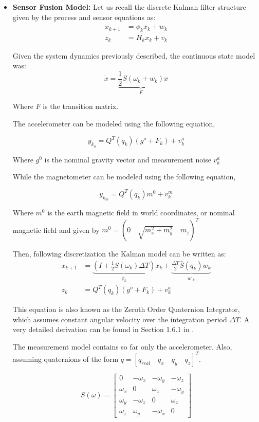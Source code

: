 \documentclass[a4paper,10pt]{article}
\begin{document}
\begin{itemize}
\item \textbf{Sensor Fusion Model: } Let us recall the discrete Kalman filter structure given by the process and sensor equations as:
\begin{align}
 x_{k+1} &= \phi_k x_k + w_k\\
 z_k     &= H_k x_k + v_k
\end{align}

Given the system dynamics previously described, the continuous state model was:
\begin{equation}
  \dot{x} = \underbrace{\frac{1}{2} S(\omega_k + w_k)}_{F} x
\end{equation}

Where $F$ is the transition matrix. 

The accelerometer can be modeled using the following equation,

\begin{equation}
 y_{k_a} = Q^T(q_k)(g^o + F_k) + v^a_k
\end{equation}

Where $g^0$ is the nominal gravity vector and measurement noise $v^a_k$

While the magnetometer can be modeled using the following equation,

\begin{equation}
 y_{k_m} = Q^T(q_k)m^0 + v^m_k
\end{equation}

Where $m^0$ is the earth magnetic field in world coordinates, or nominal magnetic field and given by $m^0 = (0 \quad \sqrt{m^2_x + m^2_y} \quad m_z)^T$

Then, following discretization the Kalman model can be written as:
\begin{align}
 x_{k+1} &= \underbrace{\left(I + \frac{1}{2}S(\omega_k)\Delta T\right)}_{\phi_k} x_k + \underbrace{\frac{\Delta T}{2}\bar{S}(q_k)w_k }_{w'_k}\\ 
 z_{k}   &=  Q^T(q_k)(g^o + F_k) + v^a_k
\end{align}

This equation is also known as the Zeroth Order Quaternion Integrator, which assumes constant angular velocity over the integration period $\Delta T$. A very detailed derivation can be found in Section 1.6.1 in \cite{Trawny2005}.

The measurement model contains so far only the accelerometer. Also, assuming quaternions of the form $q = [q_{real} \quad q_x \quad q_y \quad q_z]^T$. 

\begin{equation}
 S(\omega) = \left[
 \begin{matrix}
  0 	   & -\omega_x & -\omega_y & -\omega_z\\
  \omega_x & 0	       &  \omega_z & -\omega_y\\
  \omega_y & -\omega_z &  0	   &  \omega_x\\
  \omega_z &  \omega_y & -\omega_x &  0
 \end{matrix}\right]
\end{equation}


\end{itemize}
\end{document}
